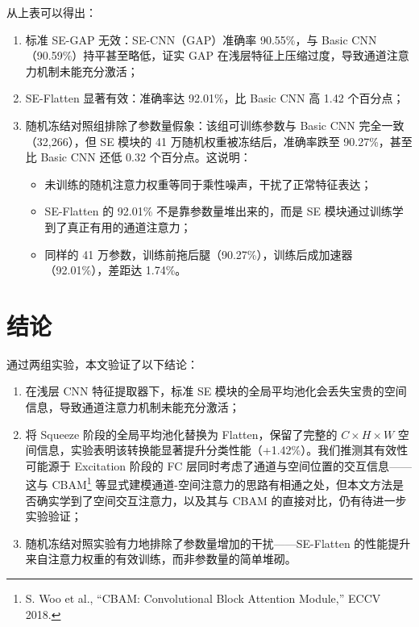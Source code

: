 \documentclass[12pt,a4paper]{ctexart}
\begin{document}
从上表可以得出：

\begin{enumerate}[nosep]
    \item 标准 SE-GAP 无效：SE-CNN（GAP）准确率 90.55\%，与 Basic CNN（90.59\%）持平甚至略低，证实 GAP 在浅层特征上压缩过度，导致通道注意力机制未能充分激活；
    \item SE-Flatten 显著有效：准确率达 92.01\%，比 Basic CNN 高 1.42 个百分点；
    \item 随机冻结对照组排除了参数量假象：该组可训练参数与 Basic CNN 完全一致（32,266），但 SE 模块的 41 万随机权重被冻结后，准确率跌至 90.27\%，甚至比 Basic CNN 还低 0.32 个百分点。这说明：
    \begin{itemize}[nosep]
        \item 未训练的随机注意力权重等同于乘性噪声，干扰了正常特征表达；
        \item SE-Flatten 的 92.01\% 不是靠参数量堆出来的，而是 SE 模块通过训练学到了真正有用的通道注意力；
        \item 同样的 41 万参数，训练前拖后腿（90.27\%），训练后成加速器（92.01\%），差距达 1.74\%。
    \end{itemize}
\end{enumerate}

\section{结论}

通过两组实验，本文验证了以下结论：

\begin{enumerate}[nosep]
    \item 在浅层 CNN 特征提取器下，标准 SE 模块的全局平均池化会丢失宝贵的空间信息，导致通道注意力机制未能充分激活；
    \item 将 Squeeze 阶段的全局平均池化替换为 Flatten，保留了完整的 $C \times H \times W$ 空间信息，实验表明该转换能显著提升分类性能（+1.42\%）。我们推测其有效性可能源于 Excitation 阶段的 FC 层同时考虑了通道与空间位置的交互信息——这与 CBAM\footnote{S. Woo et al., ``CBAM: Convolutional Block Attention Module,'' ECCV 2018.} 等显式建模通道-空间注意力的思路有相通之处，但本文方法是否确实学到了空间交互注意力，以及其与 CBAM 的直接对比，仍有待进一步实验验证；
    \item 随机冻结对照实验有力地排除了参数量增加的干扰——SE-Flatten 的性能提升来自注意力权重的有效训练，而非参数量的简单堆砌。
\end{enumerate}
\end{document}
